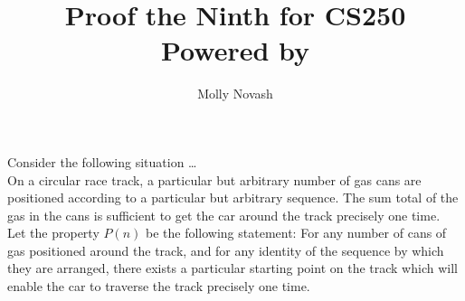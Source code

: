 \documentclass[12pt]{article}
\author{Molly Novash}
\title{%
\Huge Proof the Ninth for CS250  \\
\normalsize Powered by \LaTeXe}
\begin{document}
\sloppy
\maketitle
\bigskip

Consider the following situation \ldots \\

On a circular race track, a particular but arbitrary number of gas cans are positioned according to a particular but arbitrary sequence. The sum total of the gas in the cans is sufficient to get the car around the track precisely one time. \\

Let the property $P(n)$ be the following statement: For any number of cans of gas positioned around the track, and for any identity of the sequence by which they are arranged, there exists a particular starting point on the track which will enable the car to traverse the track precisely one time. \\
\end{document}
